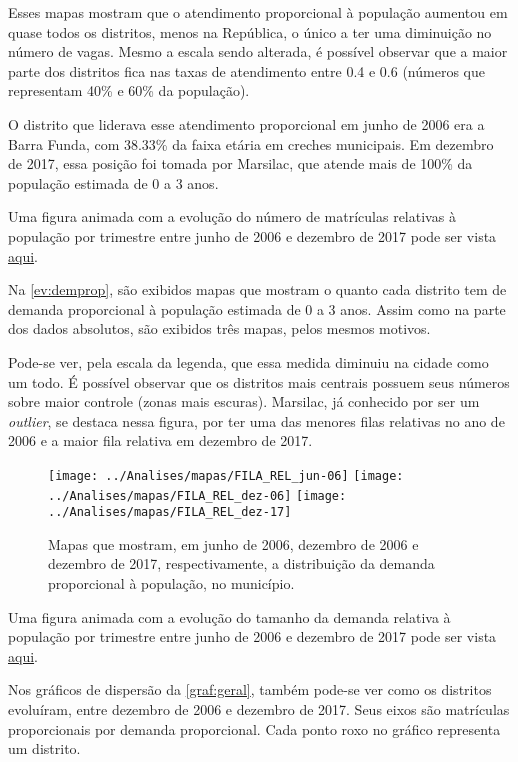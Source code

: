 Esses mapas mostram que o atendimento proporcional à população aumentou em quase todos os distritos, menos na República, o único a ter uma diminuição no número de vagas. Mesmo a escala sendo alterada, é possível observar que a maior parte dos distritos fica nas taxas de atendimento entre 0.4 e 0.6 (números que representam 40\% e 60\% da população).

O distrito que liderava esse atendimento proporcional em junho de 2006 era a Barra Funda, com 38.33\% da faixa etária em creches municipais. Em dezembro de 2017, essa posição foi tomada por Marsilac, que atende mais de 100\% da população estimada de 0 a 3 anos. 

Uma figura animada com a evolução do número de matrículas relativas à população por trimestre entre junho de 2006 e dezembro de 2017 pode ser vista \href{https://lsflp.github.io/MAC0213/multimidia/ATEND_REL.gif}{aqui}.

Na \autoref{ev:demprop}, são exibidos mapas que mostram o quanto cada distrito tem de demanda proporcional à população estimada de 0 a 3 anos. Assim como na parte dos dados absolutos, são exibidos três mapas, pelos mesmos motivos. 

Pode-se ver, pela escala da legenda, que essa medida diminuiu na cidade como um todo. É possível observar que os distritos mais centrais possuem seus números sobre maior controle (zonas mais escuras). Marsilac, já conhecido por ser um \textit{outlier}, se destaca nessa figura, por ter uma das menores filas relativas no ano de 2006 e a maior fila relativa em dezembro de 2017.

\begin{figure}[H]
	\centering
	\texttt{[image: ../Analises/mapas/FILA\_REL\_jun-06]}
	\texttt{[image: ../Analises/mapas/FILA\_REL\_dez-06]}
	\texttt{[image: ../Analises/mapas/FILA\_REL\_dez-17]}
	\caption{Mapas que mostram, em junho de 2006, dezembro de 2006 e dezembro de 2017, respectivamente, a distribuição da demanda proporcional à população, no município.}
	\label{ev:demprop}
\end{figure}

Uma figura animada com a evolução do tamanho da demanda relativa à população por trimestre entre junho de 2006 e dezembro de 2017 pode ser vista \href{https://lsflp.github.io/MAC0213/multimidia/FILA_REL.gif}{aqui}.

Nos gráficos de dispersão da \autoref{graf:geral}, também pode-se ver como os distritos evoluíram, entre dezembro de 2006 e dezembro de 2017. Seus eixos são matrículas proporcionais por demanda proporcional. Cada ponto roxo no gráfico representa um distrito.

